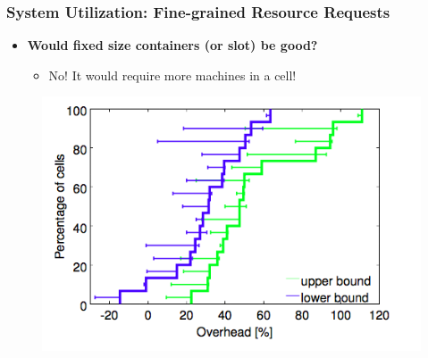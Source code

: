 \begin{frame}
\frametitle{System Utilization: Fine-grained Resource Requests}
\begin{itemize}
	\item {\bf Would fixed size containers (or slot) be good?}
	\begin{itemize}
		\item No! It would require more machines in a cell!
	\end{itemize}
\end{itemize}
\begin{figure}[h]
  \centering
  \includegraphics[scale=0.4]{./figures/borg_exp_bucket}
  \label{fig:borg_exp_size}
\end{figure}
\end{frame}

